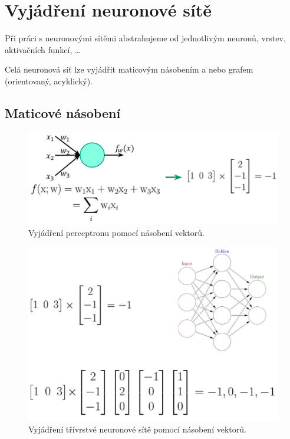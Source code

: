 \section{Vyjádření neuronové sítě}

\begin{compactitem}
    \item Při práci s neuronovými sítěmi abstrahujeme od jednotlivým neuronů, vrstev, aktivačních funkcí, \dots

    \item Celá neuronová síť lze vyjádřit maticovým násobením a nebo grafem (orientovaný, acyklický).
\end{compactitem}

\subsection{Maticové násobení}

\begin{figure}[H]
    \centering
    \includegraphics[width=0.65\linewidth]{nn_matrix_1.pdf}
    \caption{Vyjádření perceptronu pomocí násobení vektorů.}
\end{figure}

\begin{figure}[H]
    \centering
    \includegraphics[width=0.65\linewidth]{nn_matrix_2.pdf}
    \caption{Vyjádření třívrstvé neuronové sítě pomocí násobení vektorů.}
\end{figure}

